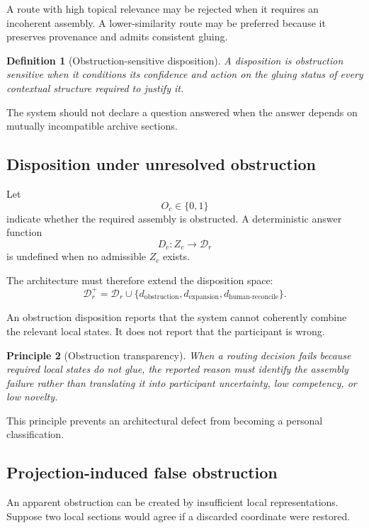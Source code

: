 \documentclass[11pt]{article}
\newtheorem{definition}{Definition}[section]
\newtheorem{principle}[definition]{Principle}
\theoremstyle{definition}
\begin{document}
A route with high topical relevance may be rejected when it requires an incoherent assembly. A lower-similarity route may be preferred because it preserves provenance and admits consistent gluing.

\begin{definition}[Obstruction-sensitive disposition]
A disposition is obstruction sensitive when it conditions its confidence and action on the gluing status of every contextual structure required to justify it.
\end{definition}

The system should not declare a question answered when the answer depends on mutually incompatible archive sections.

\subsection{Disposition under unresolved obstruction}

Let
\[
O_c\in\{0,1\}
\]
indicate whether the required assembly is obstructed. A deterministic answer function
\[
D_c:Z_c\to\mathcal D_r
\]
is undefined when no admissible \(Z_c\) exists.

The architecture must therefore extend the disposition space:
\[
\mathcal D_r^{+}
=
\mathcal D_r
\cup
\{
d_{\mathrm{obstruction}},
d_{\mathrm{expansion}},
d_{\mathrm{human\text{-}reconcile}}
\}.
\]

An obstruction disposition reports that the system cannot coherently combine the relevant local states. It does not report that the participant is wrong.

\begin{principle}[Obstruction transparency]
When a routing decision fails because required local states do not glue, the reported reason must identify the assembly failure rather than translating it into participant uncertainty, low competency, or low novelty.
\end{principle}

This principle prevents an architectural defect from becoming a personal classification.

\subsection{Projection-induced false obstruction}

An apparent obstruction can be created by insufficient local representations. Suppose two local sections would agree if a discarded coordinate were restored.
\end{document}
